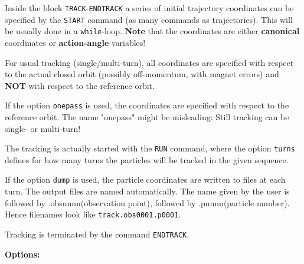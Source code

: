 
Inside the block \texttt{TRACK}-\texttt{ENDTRACK} a series 
of initial trajectory coordinates can be specified by the \texttt{START} 
command (as many commands as trajectories). This will be usually done in a 
\texttt{while}-loop. \textbf{Note} that the coordinates are either 
\textbf{canonical} coordinates or \textbf{action-angle} variables!




For usual tracking (single/multi-turn), all coordinates are specified
with respect to the actual closed orbit (possibly off-momentum, with
magnet errors) and \textbf{NOT} with respect to the reference orbit. 

            
If the option \texttt{onepass} is used, the coordinates are specified
with respect to the reference orbit. The name "onepass" might be
misleading: Still tracking can be single- or multi-turn!   
            
The tracking is actually started with the \texttt{RUN} command, where
the option \texttt{turns} defines for how many turns the particles will
be tracked in the given sequence. 
          
If the option \texttt{dump} is used, the particle coordinates are
written to files at each turn. The output files are named
automatically. The name given by the user is followed by
.obsnnnn(observation point), followed by .pnnnn(particle number). Hence
filenames look like \texttt{track.obs0001.p0001}.  

Tracking is terminated by the command \texttt{ENDTRACK}.
          
{\bf Options:} 
	  
